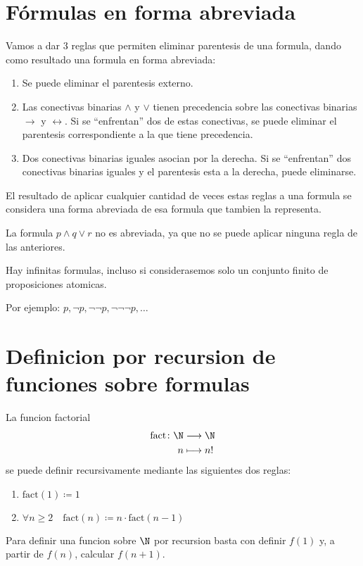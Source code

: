 \vspace{0.6cm}

\section{Fórmulas en forma abreviada}
\begin{definition}
	Vamos a dar 3 reglas que permiten eliminar parentesis de una formula, dando como resultado una formula en forma abreviada:
	\begin{enumerate}
		\item Se puede eliminar el parentesis externo.
		\item Las conectivas binarias \(\wedge \) y \(\vee  \) tienen precedencia sobre las conectivas binarias \(\rightarrow \) y \(\leftrightarrow \). Si se ``enfrentan'' dos de estas conectivas, se puede eliminar el parentesis correspondiente a la que tiene precedencia.
		\item Dos conectivas binarias iguales asocian por la derecha. Si se ``enfrentan'' dos conectivas binarias iguales y el parentesis esta a la derecha, puede eliminarse.
	\end{enumerate}
	El resultado de aplicar cualquier cantidad de veces estas reglas a una formula se considera una forma abreviada de esa formula que tambien la representa.
\end{definition}

\begin{remark}
	La formula \(p \wedge  q \vee  r \) no es abreviada, ya que no se puede aplicar ninguna regla de las anteriores.
\end{remark}

\begin{remark}
	Hay infinitas formulas, incluso si considerasemos solo un conjunto finito de proposiciones atomicas.

	Por ejemplo: \(p, \neg p, \neg\neg p, \neg\neg\neg p, \ldots \)
\end{remark}

\section{Definicion por recursion de funciones sobre formulas}
\begin{example}
	La funcion factorial
	\[
		\begin{aligned}
			\text{fact}  \colon \N & \longrightarrow \N \\
			n                      & \longmapsto  n!
		\end{aligned}
	\]
	se puede definir recursivamente mediante las siguientes dos reglas:
	\begin{enumerate}
		\item \(\text{fact} (1) \coloneqq 1 \)
		\item \(\forall n \geq 2 \quad \text{fact} (n) \coloneqq n \cdot \text{fact} (n-1)\)
	\end{enumerate}
\end{example}
\begin{remark}
	Para definir una funcion sobre \(\N \) por recursion basta con definir \(f(1 )\) y, a partir de \(f(n )\), calcular \(f(n+1)\).
\end{remark}


